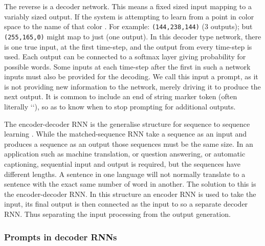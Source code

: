 \documentclass[12pt,parskip]{komatufte}\right
\begin{document}


The reverse is a decoder network.
This means a fixed sized input mapping to a variably sized output.
If the system is attempting to learn from a point in color space to the name of that color .
For example: \texttt{(144,238,144)}  (3 outputs); but \texttt{(255,165,0)} might map to just  (one output).
In this decoder type network, there is one true input, at the first time-step, and the output from every time-step is used.
Each output can be connected to a softmax layer giving probability for possible words.
Some inputs at each time-step after the first in such a network inputs must also be provided for the decoding.
We call this input a prompt, as it is not providing new information to the network, merely driving it to produce the next output.
It is common to include an end of string marker token (often literally ``),
so as to know when to stop prompting for additional outputs.


The encoder-decoder RNN is the generalise structure for sequence to sequence learning .
While the matched-sequence RNN take a sequence as an input and produces a sequence as an output those sequences must be the same size.
In an application such as machine translation, or question answering, or automatic captioning, sequential input and output is required, but the sequences have different lengths.
A sentence in one language will not normally translate to a sentence with the exact same number of word in another.
The solution to this is the encoder-decoder RNN.
In this structure an encoder RNN is used to take the input, its final output is then connected as the input to so a separate decoder RNN.
Thus separating the input processing from the output generation.


\subsubsection{Prompts in decoder RNNs}
\end{document}
